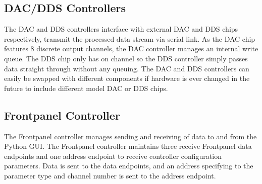 \documentclass[11pt]{article}
\begin{document}
\subsection{DAC/DDS Controllers}

The DAC and DDS controllers interface with external DAC and DDS chips
respectively, transmit the processed data stream via serial link. As the
DAC chip features 8 discrete output channels, the DAC controller manages
an internal write queue. The DDS chip only has on channel so the DDS
controller simply passes data straight through without any queuing. The
DAC and DDS controllers can easily be swapped with different components
if hardware is ever changed in the future to include different model DAC
or DDS chips.

\subsection{Frontpanel Controller}

The Frontpanel controller manages sending and receiving of data to and
from the Python GUI\@. The Frontpanel controller maintains three receive
Frontpanel data endpoints and one address endpoint to receive controller
configuration parameters. Data is sent to the data endpoints, and an
address specifying to the parameter type and channel number is sent to
the address endpoint.
\end{document}
